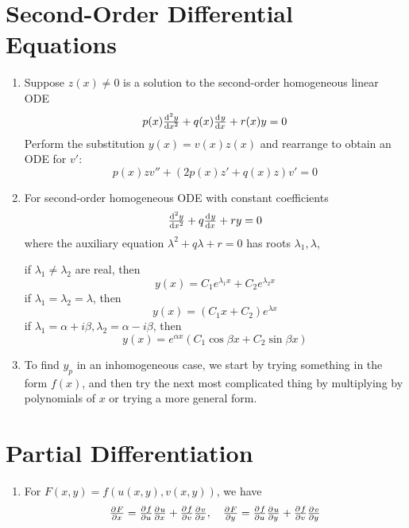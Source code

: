\documentclass{styles/note}
\begin{document}
\newpage
\section{Second-Order Differential Equations}
  
  \begin{enumerate}[label=(\alph*)]
    \item Suppose $z(x) \neq 0$ is a solution to the second-order homogeneous linear ODE
      \[ p(x) \od[2]{y}{x} + q(x) \od{y}{x} + r(x)y = 0 \]
      Perform the substitution $y(x) = v(x) z(x)$ and rearrange to obtain an ODE for $v'$:
      \begin{equation}
        p(x) z v'' + \left(2p(x) z' + q(x) z\right) v' = 0
      \end{equation}
    
    \item For second-order homogeneous ODE with constant coefficients
      \[ \od[2]{y}{x} + q \od{y}{x} + ry = 0 \]
      where the auxiliary equation $\lambda^2 + q\lambda + r = 0$ has roots $\lambda_1, \lambda$,
      
      if $\lambda_1 \neq \lambda_2$ are real, then
      \begin{equation}
        y(x) = C_1 e^{\lambda_1 x} + C_2 e^{\lambda_2 x}
      \end{equation}
      if $\lambda_1 = \lambda_2 = \lambda$, then
      \begin{equation}
        y(x) = (C_1 x + C_2) e^{\lambda x}
      \end{equation}
      if $\lambda_1 = \alpha + i\beta, \lambda_2 = \alpha - i\beta$, then
      \begin{equation}
        y(x) = e^{\alpha x} (C_1 \cos \beta x + C_2 \sin \beta x)
      \end{equation}
    
    \item To find $y_p$ in an inhomogeneous case, we start by trying something in the form $f(x)$, and then try the next most complicated thing by multiplying by polynomials of $x$ or trying a more general form.
    \end{enumerate}


\newpage
\section{Partial Differentiation}
  
  \begin{enumerate}[label=(\alph*)]
    \item For $F(x, y) = f(u(x, y), v(x, y))$, we have
      \begin{equation}
        \pd{F}{x} = \pd{f}{u} \pd{u}{x} + \pd{f}{v} \pd{v}{x}, \quad \pd{F}{y} = \pd{f}{u} \pd{u}{y} + \pd{f}{v} \pd{v}{y}
      \end{equation}
  \end{enumerate}
\end{document}
